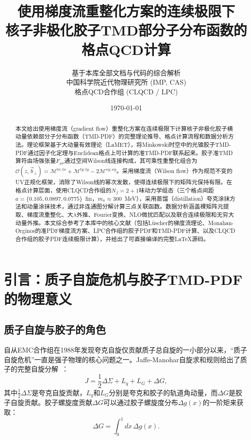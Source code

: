 \documentclass[12pt,a4paper]{ctexart}
\title{\heiti 使用梯度流重整化方案的连续极限下\\核子非极化胶子TMD部分子分布函数的格点QCD计算}
\author{
    \begin{tabular}{c}
        基于本库全部文档与代码的综合解析 \\
        \small 中国科学院近代物理研究所 (IMP, CAS) \\
        \small 格点QCD合作组 (CLQCD / LPC)
    \end{tabular}
}
\date{\today}
\theoremstyle{definition}
\begin{document}
\maketitle

\begin{abstract}
\noindent
本文给出使用梯度流（gradient flow）重整化方案在连续极限下计算核子非极化胶子横动量依赖部分子分布函数（TMD-PDF）的完整理论推导、格点计算流程和数据分析方法。理论框架基于大动量有效理论（LaMET），将Minkowski时空中的光锥胶子TMD-PDF通过因子化定理与Euclidean格点上可计算的准TMD-PDF联系起来。胶子准TMD算符由场强张量$F_{\mu\nu}$通过空间Wilson线连接构成，其可乘性重整化组合为$\mathcal{O}(z,\vec{b}_\perp) = \mathcal{M}^{tx;tx} + \mathcal{M}^{ty;ty} - 2\mathcal{M}^{xy;xy}$。采用梯度流（Wilson flow）作为规范不变的UV正规化框架，消除了Wilson线的幂次发散，使得连续极限下的矩阵元保持有限。在格点计算层面，使用CLQCD合作组的$N_f=2+1$味动力学组态（三个格点间距$a = \{0.105, 0.0897, 0.0775\}$~fm，$m_\pi \approx 300$~MeV），采用蒸馏（distillation）夸克涂抹方法和动量涂抹技术，通过非连通图分解计算三点关联函数。数据分析涵盖裸矩阵元提取、梯度流重整化、大$\lambda$外推、Fourier变换、NLO微扰匹配以及联合连续极限和无穷大动量外推。本文综合参考了本库中的核心文献（包括L\"uscher的梯度流理论、Monahan-Orginos的准PDF梯度流方案、LPC合作组的胶子PDF和TMD-PDF计算、以及CLQCD合作组的胶子PDF连续极限计算），并给出了可直接编译的完整LaTeX源码。
\end{abstract}

\tableofcontents
\newpage


\section{引言：质子自旋危机与胶子TMD-PDF的物理意义}

\subsection{质子自旋与胶子的角色}

自从EMC合作组在1988年发现夸克自旋仅贡献质子总自旋的一小部分以来，``质子自旋危机''一直是强子物理的核心问题之一。Jaffe-Manohar自旋求和规则给出了质子的完整自旋分解~\cite{Jaffe:1989jz}：
\begin{equation}
    J = \frac{1}{2}\Delta\Sigma + L_q + L_G + \Delta G,
    \label{eq:jaffe_manohar}
\end{equation}
其中$\frac{1}{2}\Delta\Sigma$是夸克自旋贡献，$L_q$和$L_G$分别是夸克和胶子的轨道角动量，而$\Delta G$是胶子自旋贡献。胶子螺旋度贡献$\Delta G$可以通过胶子螺旋度分布$\Delta g(x)$的一阶矩来获取：
\begin{equation}
    \Delta G = \int_0^1 dx \, \Delta g(x).
    \label{eq:delta_G}
\end{equation}
\end{document}
